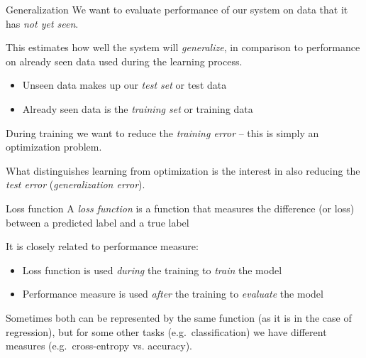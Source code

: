 \documentclass[dvipsnames]{beamer}
\def\eg{e.g.\ }
\begin{document}
		\begin{frame}{Generalization}
		We want to evaluate performance of our system on data that it has \emph{not yet seen}. \pause
		
		This estimates how well the system will \emph{generalize}, in comparison to performance on already seen data used during the learning process. 
		\pause
		\begin{itemize}
			\item Unseen data makes up our \emph{test set} or test data \pause
			\item Already seen data is the \emph{training set} or training data \pause
		\end{itemize}

	  During training we want to reduce the \emph{training error} -- this is simply an optimization problem.  \pause 
		
		What distinguishes learning from optimization is the interest in also reducing the \emph{test error} (\emph{generalization error}).
		\end{frame}
		
				\begin{frame}{Loss function}
			A \emph{loss function} is a function that measures the difference (or loss) between a predicted label and a true label \pause
			
			It is closely related to performance measure: \pause
			\begin{itemize}
				\item Loss function is used \emph{during} the training to \emph{train} the model \pause
				\item Performance measure is used \emph{after} the training to \emph{evaluate} the model \pause
			\end{itemize}
			
			Sometimes both can be represented by the same function (as it is in the case of regression), but for some other tasks (\eg classification) we have different measures (\eg cross-entropy vs. accuracy).
		\end{frame}
		
\end{document}
